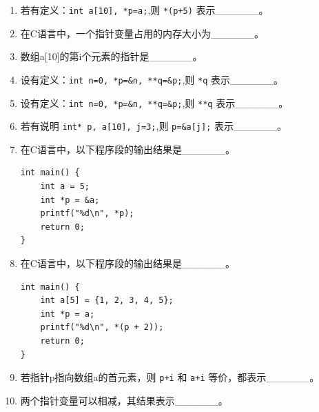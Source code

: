 \documentclass[a4paper,12pt]{article}
\begin{document}
\begin{enumerate}
	\item 若有定义：\texttt{int a[10], *p=a;},则 \texttt{*(p+5)} 表示\_\_\_\_\_\_。
	      \vspace{0.3cm}

	\item 在C语言中，一个指针变量占用的内存大小为\_\_\_\_\_\_。
	      \vspace{0.3cm}

	\item 数组a[10]的第i个元素的指针是\_\_\_\_\_\_。
	      \vspace{0.3cm}

	\item 设有定义：\texttt{int n=0, *p=\&n, **q=\&p;},则 \texttt{*q} 表示\_\_\_\_\_\_。
	      \vspace{0.3cm}

	\item 设有定义：\texttt{int n=0, *p=\&n, **q=\&p;},则 \texttt{**q} 表示\_\_\_\_\_\_。
	      \vspace{0.3cm}

	\item 若有说明 \texttt{int* p, a[10], j=3;},则 \texttt{p=\&a[j];} 表示\_\_\_\_\_\_。
	      \vspace{0.3cm}

	\item 在C语言中，以下程序段的输出结果是\_\_\_\_\_\_。
	      \begin{verbatim}
int main() {
    int a = 5;
    int *p = &a;
    printf("%d\n", *p);
    return 0;
}
    \end{verbatim}
	      \vspace{0.3cm}

	\item 在C语言中，以下程序段的输出结果是\_\_\_\_\_\_。
	      \begin{verbatim}
int main() {
    int a[5] = {1, 2, 3, 4, 5};
    int *p = a;
    printf("%d\n", *(p + 2));
    return 0;
}
    \end{verbatim}
	      \vspace{0.3cm}

	\item 若指针p指向数组a的首元素，则 \texttt{p+i} 和 \texttt{a+i} 等价，都表示\_\_\_\_\_\_。
	      \vspace{0.3cm}

	\item 两个指针变量可以相减，其结果表示\_\_\_\_\_\_。
	      \vspace{0.3cm}


\end{enumerate}
\end{document}
